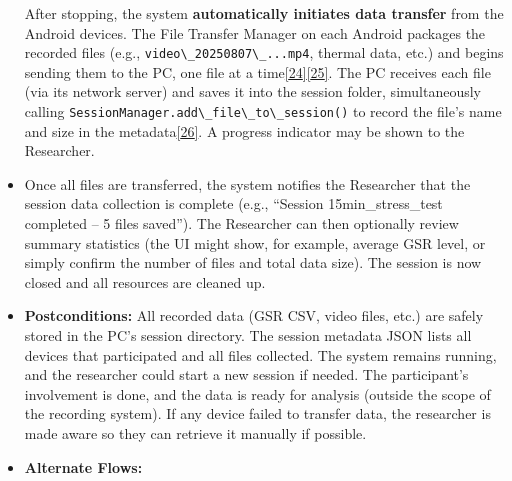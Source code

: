 \documentclass[12pt,a4paper]{article}
\begin{document}
\begin{itemize}
  After stopping, the system \textbf{automatically initiates data transfer} from the Android devices. The File Transfer Manager on each Android packages the recorded files (e.g., \passthrough{\lstinline!video\_20250807\_...mp4!}, thermal data, etc.) and begins sending them to the PC, one file at a time\href{https://github.com/buccancs/bucika_gsr/blob/7048f7f6a7536f5cd577ed2184800d3dad97fd08/AndroidApp/src/main/java/com/multisensor/recording/managers/FileTransferManager.kt\#L124-L132}{{[}24{]}}\href{https://github.com/buccancs/bucika_gsr/blob/7048f7f6a7536f5cd577ed2184800d3dad97fd08/AndroidApp/src/main/java/com/multisensor/recording/managers/FileTransferManager.kt\#L142-L150}{{[}25{]}}. The PC receives each file (via its network server) and saves it into the session folder, simultaneously calling \passthrough{\lstinline!SessionManager.add\_file\_to\_session()!} to record the file's name and size in the metadata\href{https://github.com/buccancs/bucika_gsr/blob/7048f7f6a7536f5cd577ed2184800d3dad97fd08/PythonApp/session/session_manager.py\#L130-L138}{{[}26{]}}. A progress indicator may be shown to the Researcher.
\item
  Once all files are transferred, the system notifies the Researcher that the session data collection is complete (e.g., ``Session 15min\_stress\_test completed -- 5 files saved''). The Researcher can then optionally review summary statistics (the UI might show, for example, average GSR level, or simply confirm the number of files and total data size). The session is now closed and all resources are cleaned up.
\item
  \textbf{Postconditions:} All recorded data (GSR CSV, video files, etc.) are safely stored in the PC's session directory. The session metadata JSON lists all devices that participated and all files collected. The system remains running, and the researcher could start a new session if needed. The participant's involvement is done, and the data is ready for analysis (outside the scope of the recording system). If any device failed to transfer data, the researcher is made aware so they can retrieve it manually if possible.
\item
  \textbf{Alternate Flows:}\\


\end{itemize}
\end{document}
